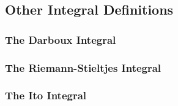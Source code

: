 

\subsection{Other Integral Definitions}

\subsubsection{The Darboux Integral}







\subsubsection{The Riemann-Stieltjes Integral}



\subsubsection{The Ito Integral}









